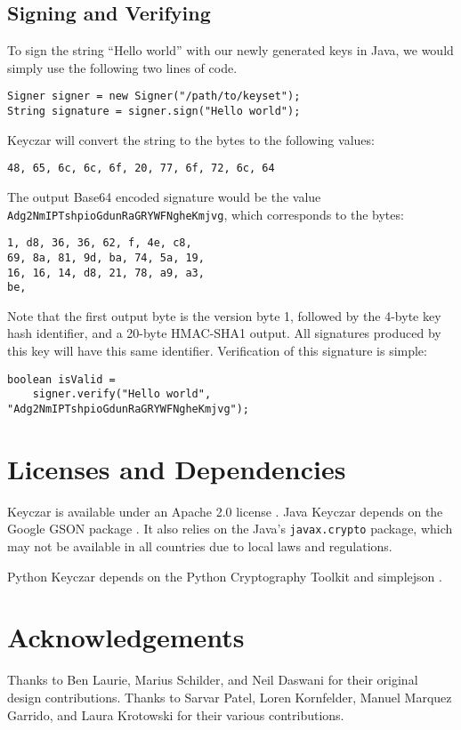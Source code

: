 \documentclass{llncs}
\begin{document}
\subsection{Signing and Verifying} 

To sign the string ``Hello world'' with our newly generated keys in Java, we
would simply use the following two lines of code.

\begin{verbatim}
Signer signer = new Signer("/path/to/keyset"); 
String signature = signer.sign("Hello world");
\end{verbatim}

Keyczar will convert the string to the bytes to the following values:
\begin{verbatim}
48, 65, 6c, 6c, 6f, 20, 77, 6f, 72, 6c, 64
\end{verbatim} 

The output Base64 encoded signature would be the value {\tt
Adg2NmIPTshpioGdunRaGRYWFNgheKmjvg}, which corresponds to the bytes:
\begin{verbatim}
1, d8, 36, 36, 62, f, 4e, c8,
69, 8a, 81, 9d, ba, 74, 5a, 19,
16, 16, 14, d8, 21, 78, a9, a3,
be,
\end{verbatim}

Note that the first output byte is the version byte 1, followed by the 4-byte
key hash identifier, and a 20-byte HMAC-SHA1 output. All signatures produced by
this key will have this same identifier. Verification of this signature is
simple:
\begin{verbatim}
boolean isValid =
    signer.verify("Hello world", "Adg2NmIPTshpioGdunRaGRYWFNgheKmjvg");
\end{verbatim}

\section{Licenses and Dependencies}

Keyczar is available under an Apache 2.0 license \cite{apache2}. Java Keyczar
depends on the Google GSON package \cite{google-gson}. It also relies on the
Java's {\tt javax.crypto} package, which may not be available in all countries
due to local laws and regulations.

Python Keyczar depends on the Python Cryptography Toolkit \cite{python-crypto}
and simplejson \cite{simplejson}. 

\section{Acknowledgements}

Thanks to Ben Laurie, Marius Schilder, and Neil Daswani for their original
design contributions. Thanks to Sarvar Patel, Loren Kornfelder, Manuel Marquez
Garrido, and Laura Krotowski for their various contributions.



\end{document}
